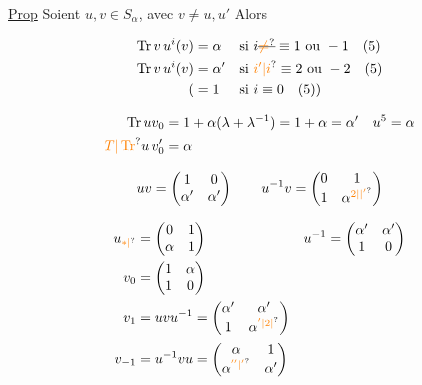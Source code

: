
\uline{Prop} Soient $u,v\in S_\alpha$, avec $v\ne u,u'$ Alors

\[
\begin{aligned}
\operatorname{Tr}v\,u^i(v)&=\alpha &&\text{si }i\deleted{\unsure{\ne}}\equiv1\text{ ou }-1\quad(5)\\
\operatorname{Tr}v\,u^i(v)&=\alpha' &&\text{si }\unsure{i'|i}\equiv2\text{ ou }-2\quad(5)\\
(&=1&&\text{si }i\equiv0\quad(5))
\end{aligned}
\]

\[
\begin{aligned}
\operatorname{Tr}uv_0&=1+\alpha(\lambda+\lambda^{-1})=1+\alpha=\alpha' &u^5&=\alpha\\
\unsure{T|\operatorname{Tr}}u\,v'_0&=\alpha
\end{aligned}
\]

\[
uv=\begin{pmatrix}1&0\\\alpha'&\alpha'\end{pmatrix}\qquad
u^{-1}v=\begin{pmatrix}0&1\\1&\alpha^{\unsure{2|{}|'}}\end{pmatrix}
\]

\[
\begin{aligned}
u_{\unsure{*|{}}}&=\begin{pmatrix}0&1\\\alpha&1\end{pmatrix}
&u^{-1}&=\begin{pmatrix}\alpha'&\alpha'\\1&0\end{pmatrix}\\
v_0&=\begin{pmatrix}1&\alpha\\1&0\end{pmatrix}\\
v_1&=uvu^{-1}=\begin{pmatrix}\alpha'&\alpha'\\1&\alpha^{\unsure{'|2|{}}}\end{pmatrix}\\
v_{-1}&=u^{-1}vu=\begin{pmatrix}\alpha&1\\\alpha^{\unsure{''|'}}&\alpha'\end{pmatrix}
\end{aligned}
\]

